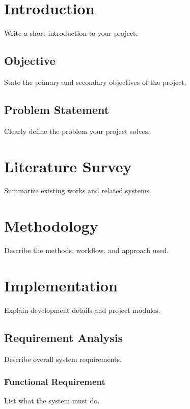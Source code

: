 \documentclass[12pt, a4paper]{report}
\begin{document}
\clearpage


\section{Introduction}
Write a short introduction to your project.

\subsection{Objective}
State the primary and secondary objectives of the project.

\subsection{Problem Statement}
Clearly define the problem your project solves.

\section{Literature Survey}
Summarize existing works and related systems.

\section{Methodology}
Describe the methods, workflow, and approach used.

\section{Implementation}
Explain development details and project modules.

\subsection{Requirement Analysis}
Describe overall system requirements.

\subsubsection{Functional Requirement}
List what the system must do.
\end{document}

